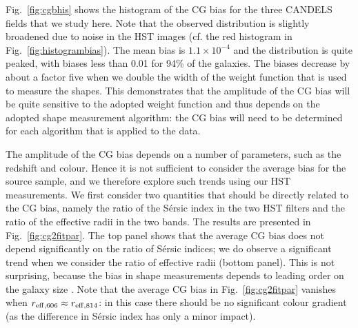 \documentclass[useAMS,usenatbib]{mnras}
\begin{document}
Fig.~\ref{fig:cgbhis} shows the histogram of the CG bias for the three CANDELS fields that we study here.
Note that the observed distribution is slightly broadened due to noise in the HST images (cf. the red histogram in Fig.~\ref{fig:histogrambias}). The mean bias is $1.1\times 10^{-4}$ and the distribution is quite peaked, with biases less than 0.01 for 94\% of the galaxies.  The biases decrease by about a factor five when we double the width of the weight function that is used to measure the shapes. This demonstrates that the amplitude of the CG bias will be quite sensitive to the adopted weight function and thus depends on the adopted shape measurement algorithm: the CG bias will need to be determined for each algorithm that is applied to the data.


The amplitude of the CG bias depends on a number of parameters, such as the redshift and colour. Hence it is not sufficient to consider the average bias for the source sample, and we therefore explore such trends using our HST measurements. We first consider two quantities that should be directly related to
the CG bias, namely the ratio of the S{\'e}rsic index in the two HST filters and the ratio of the effective
radii in the two bands. The results are presented in Fig.~\ref{fig:cg2fitpar}. The top panel shows that the
average CG bias does not depend significantly on the ratio of S{\'e}rsic indices; we do observe a significant trend when we consider the ratio of effective radii (bottom panel). This is not surprising, because the bias in shape measurements depends to leading order on the galaxy size \citep{Massey13}. Note that the average CG bias in Fig.~\ref{fig:cg2fitpar} vanishes  when $r_{\rm eff,606}\approx r_{\rm eff, 814}$: in this case there should be no significant colour gradient (as the difference in S{\'e}rsic index has only a minor impact).
\end{document}
